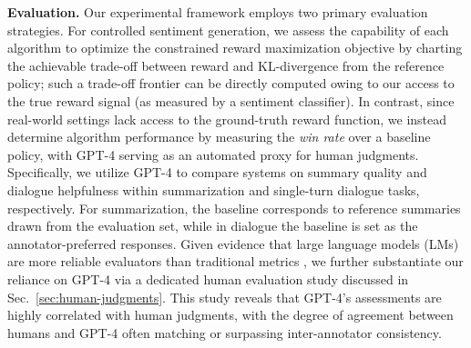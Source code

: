 \textbf{Evaluation.} Our experimental framework employs two primary evaluation strategies. For controlled sentiment generation, we assess the capability of each algorithm to optimize the constrained reward maximization objective by charting the achievable trade-off between reward and KL-divergence from the reference policy; such a trade-off frontier can be directly computed owing to our access to the true reward signal (as measured by a sentiment classifier). In contrast, since real-world settings lack access to the ground-truth reward function, we instead determine algorithm performance by measuring the \textit{win rate} over a baseline policy, with GPT-4 serving as an automated proxy for human judgments. Specifically, we utilize GPT-4 to compare systems on summary quality and dialogue helpfulness within summarization and single-turn dialogue tasks, respectively. For summarization, the baseline corresponds to reference summaries drawn from the evaluation set, while in dialogue the baseline is set as the annotator-preferred responses. Given evidence that large language models (LMs) are more reliable evaluators than traditional metrics \citep{Chen2023ExploringTU}, we further substantiate our reliance on GPT-4 via a dedicated human evaluation study discussed in Sec.~\ref{sec:human-judgments}. This study reveals that GPT-4's assessments are highly correlated with human judgments, with the degree of agreement between humans and GPT-4 often matching or surpassing inter-annotator consistency.

